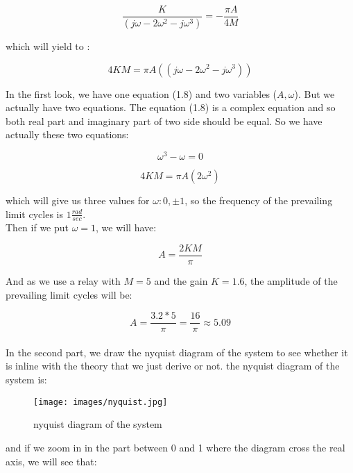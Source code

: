 \documentclass[11pt]{scrartcl} %
\begin{document}
\begin{equation}
    \frac{K}{(j\omega - 2\omega ^2 - j\omega ^3)} = -\frac{\pi A}{4M}
\end{equation}

which will yield to :

\begin{equation}
    4KM = \pi A((j\omega - 2\omega ^2 - j\omega ^3))
\end{equation}

In the first look, we have one equation (1.8) and two variables ($A, \omega$). But we actually have two equations. The equation (1.8) is a complex equation and so both real part and imaginary part of two side should be equal. So we have actually these two equations:

\begin{equation}
    \omega ^3 - \omega = 0
\end{equation}

\begin{equation}
    4KM = \pi A (2\omega ^2)
\end{equation}

which will give us three values for $\omega: 0, \pm 1$, so the frequency of the prevailing limit
cycles is $1 \frac{rad}{sec}$.\\

Then if we put $\omega = 1$, we will have:

\begin{equation}
    A = \frac{2KM}{\pi}
\end{equation}

And as we use a relay with $M = 5$ and the gain $K = 1.6$, the amplitude of the prevailing limit cycles will be:

\begin{equation}
    A = \frac{3.2*5}{\pi} = \frac{16}{\pi} \approx 5.09 
\end{equation}\\

In the second part, we draw the nyquist diagram of the system to see whether it is inline with the theory that we just derive or not. the nyquist diagram of the system is:

\begin{figure}[H]
	\centering
	\texttt{[image: images/nyquist.jpg]}
	\caption{nyquist diagram of the system}
\end{figure}

and if we zoom in in the part between 0 and 1 where the diagram cross the real axis, we will see that:
\end{document}
